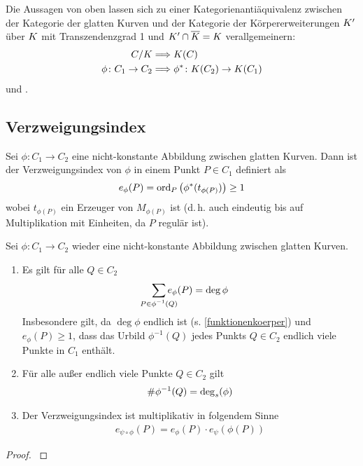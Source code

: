 \begin{Satz}[Kategorienantiäquivalenz]\label{kategorienaequivalenz}
  Die Aussagen von oben lassen sich zu einer Kategorienantiäquivalenz
  zwischen der Kategorie der glatten Kurven und der Kategorie der
  Körpererweiterungen $K'$ über $K$ mit Transzendenzgrad 1 und
  $K'\cap\overline K=K$ verallgemeinern:
  \begin{align*}
    C/K &\Longrightarrow K(C)\\
    \phi\colon C_1\to C_2 &\Longrightarrow \phi^*\colon K(C_2)\to K(C_1)
  \end{align*}
  \cite[siehe][Corollary I.6.11]{hartshorne} und
  \cite[siehe][Remark II.2.5]{silverman}.
\end{Satz}


\subsection{Verzweigungsindex}
\begin{Definition}[Verzweigungsindex]\label{verzweigungsindex}
  Sei $\phi\colon C_1\to C_2$ eine nicht-konstante Abbildung zwischen
  glatten Kurven.
  Dann ist der Verzweigungsindex von $\phi$ in einem Punkt
  $P\in C_1$ definiert als
  \begin{gather*}
    e_\phi(P) = \operatorname{ord}_P \left( \phi^*(t_{\phi(P)}) \right) \geq 1
  \end{gather*}
  wobei $t_{\phi(P)}$ ein Erzeuger von $M_{\phi(P)}$ ist (d.\,h. auch
  eindeutig bis auf Multiplikation mit Einheiten, da $P$ regulär ist).
\end{Definition}

\begin{Satz}\label{sepgrad}
  Sei $\phi\colon C_1\to C_2$ wieder eine nicht-konstante Abbildung
  zwischen glatten Kurven. 
  \begin{enumerate}[label=\roman*)]
  \item Es gilt für alle $Q\in C_2$
    \begin{gather*}
      \sum_{\mathclap{P\in\phi^{-1}(Q)}} e_\phi(P) = \deg\phi
    \end{gather*}
    Insbesondere gilt, da $\deg\phi$ endlich ist
    (s. \ref{funktionenkoerper}) und $e_\phi(P)\geq 1$,
    dass das Urbild $\phi^{-1}(Q)$ jedes Punkts $Q\in C_2$
    endlich viele Punkte in $C_1$ enthält.
  \item Für alle außer endlich viele Punkte $Q\in C_2$ gilt
    \begin{gather*}
      \#\phi^{-1}(Q) = \operatorname{\deg}_s(\phi)
    \end{gather*}
  \item Der Verzweigungsindex ist multiplikativ
    in folgendem Sinne
    \begin{gather*}
      e_{\psi\circ\phi}(P) = e_\phi(P) \cdot e_\psi(\phi(P))
    \end{gather*}
  \end{enumerate}
  \begin{proof}
    \cite[siehe][Proposition II.2.6]{silverman}
  \end{proof}


\end{Satz}

